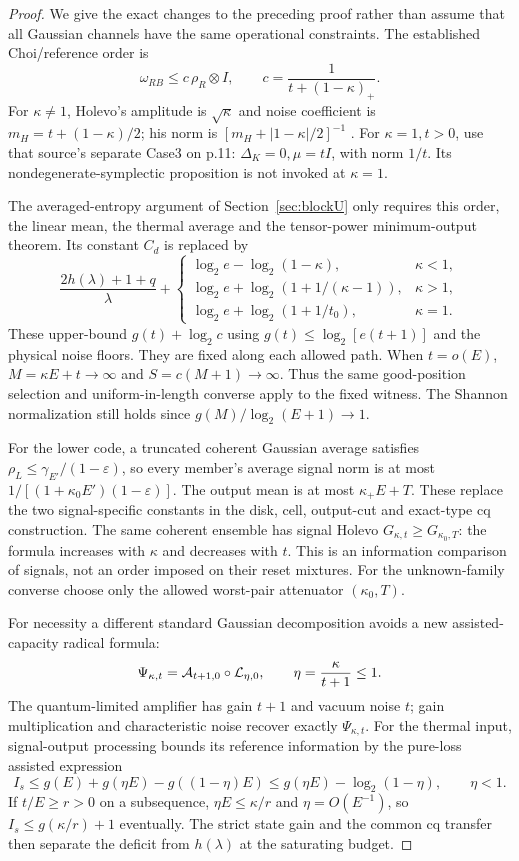 \documentclass[11pt]{article}
\begin{document}
\begin{proof}
We give the exact changes to the preceding proof rather than assume
that all Gaussian channels have the same operational constraints.
The established Choi/reference order is
\[
 \omega_{RB}\le c\,\rho_R\otimes I,\qquad
 c=\frac1{t+(1-\kappa)_+}.
\]
For \(\kappa\ne1\), Holevo's amplitude is \(\sqrt\kappa\) and noise
coefficient is \(m_H=t+(1-\kappa)/2\); his norm is
\([m_H+|1-\kappa|/2]^{-1}\)
\cite[Proposition2 and p.13 example]{choi}.
For \(\kappa=1,t>0\), use that source's separate Case3 on p.11:
\(\Delta_K=0,\mu=tI\), with norm \(1/t\).
Its nondegenerate-symplectic proposition is not invoked at \(\kappa=1\).

The averaged-entropy argument of Section~\ref{sec:blockU} only requires
this order, the linear mean, the thermal average and the tensor-power
minimum-output theorem. Its constant \(C_d\) is replaced by
\[
 \frac{2h(\lambda)+1+q}{\lambda}+
 \begin{cases}
  \log_2e-\log_2(1-\kappa),&\kappa<1,\\
  \log_2e+\log_2(1+1/(\kappa-1)),&\kappa>1,\\
  \log_2e+\log_2(1+1/t_0),&\kappa=1.
 \end{cases}
\]
These upper-bound \(g(t)+\log_2c\) using
\(g(t)\le\log_2[e(t+1)]\) and the physical noise floors.
They are fixed along each allowed path. When \(t=o(E)\),
\(M=\kappa E+t\to\infty\) and \(S=c(M+1)\to\infty\).
Thus the same good-position selection and uniform-in-length converse
apply to the fixed witness. The Shannon normalization still holds since
\(g(M)/\log_2(E+1)\to1\).

For the lower code, a truncated coherent Gaussian average satisfies
\(\rho_L\le\gamma_{E'}/(1-\varepsilon)\), so every member's average
signal norm is at most \(1/[(1+\kappa_0E')(1-\varepsilon)]\).
The output mean is at most \(\kappa_+E+T\).
These replace the two signal-specific constants in the disk, cell,
output-cut and exact-type cq construction. The same coherent ensemble
has signal Holevo \(G_{\kappa,t}\ge G_{\kappa_0,T}\):
the formula increases with \(\kappa\) and decreases with \(t\).
This is an information comparison of signals, not an order imposed on
their reset mixtures. For the unknown-family converse choose only the
allowed worst-pair attenuator \((\kappa_0,T)\).

For necessity a different standard Gaussian decomposition avoids a new
assisted-capacity radical formula:
\[
 \Psi_{\kappa,t}={\cal A}_{t+1,0}\circ{\cal L}_{\eta,0},
 \qquad \eta=\frac{\kappa}{t+1}\le1 .
\]
The quantum-limited amplifier has gain \(t+1\) and vacuum noise \(t\);
gain multiplication and characteristic noise recover exactly
\(\Psi_{\kappa,t}\). For the thermal input,
signal-output processing bounds its reference information by the
pure-loss assisted expression
\[
 I_s\le g(E)+g(\eta E)-g((1-\eta)E)
       \le g(\eta E)-\log_2(1-\eta),\qquad \eta<1 .
\]
If \(t/E\ge r>0\) on a subsequence, \(\eta E\le\kappa/r\) and
\(\eta=O(E^{-1})\), so \(I_s\le g(\kappa/r)+1\) eventually.
The strict state gain and the common cq transfer then separate the
deficit from \(h(\lambda)\) at the saturating budget.


\end{proof}
\end{document}
